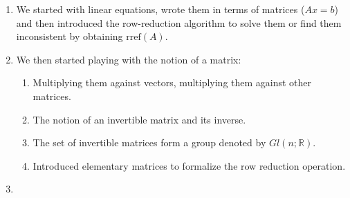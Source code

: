 \documentclass[12pt,letterpaper]{article}
\begin{document}
\thispagestyle{fancy}
 
 \begin{enumerate}
        \item We started with linear equations, wrote them in terms of matrices ($A x = b$) and then introduced the row-reduction algorithm to solve them or find them inconsistent by obtaining $\text{rref}(A)$.
        \item We then started playing with the notion of a matrix:
        \begin{enumerate}
            \item Multiplying them against vectors, multiplying them against other matrices.
            \item The notion of an invertible matrix and its inverse.
            \item The set of invertible matrices form a group denoted by $Gl(n; \mathbb{R})$.
            \item Introduced elementary matrices to formalize the row reduction operation.
        \end{enumerate}
        \item


\end{enumerate}
\end{document}
